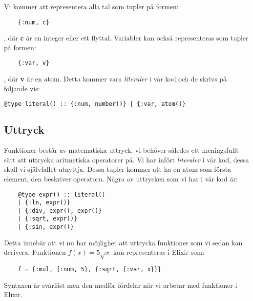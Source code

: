 \documentclass[a4paper,11pt]{article}
\begin{document}
Vi kommer att representera alla tal som tupler på formen: 
\begin{verbatim}
    {:num, c}
\end{verbatim}
, där \textbf{c} är en integer eller ett flyttal. Variabler kan också representeras som tupler på formen:
\begin{verbatim}
    {:var, v}
\end{verbatim}
, där \textbf{v} är en atom. Detta kommer vara \textit{literaler} i vår kod och de skrivs på följande vis:
\begin{verbatim}
@type literal() :: {:num, number()} | {:var, atom()}
\end{verbatim}
\subsection*{Uttryck}
Funktioner består av matematiska uttryck, vi behöver således ett meningsfullt sätt att uttrycka aritmetiska operatorer på. Vi har infört \textit{literaler} i vår kod, dessa skall vi självfallet utnyttja. Dessa tupler kommer att ha en atom som första element, den beskriver operatorn. Några av uttrycken som vi har i vår kod är: 
\begin{verbatim}
    @type expr() :: literal()
    | {:ln, expr()}
    | {:div, expr(), expr()}
    | {:sqrt, expr()}
    | {:sin, expr()}
\end{verbatim}
Detta innebär att vi nu har möjlighet att uttrycka funktioner som vi sedan kan derivera. Funktionen \( f(x) = 5\sqrt{x}\) kan representeras i Elixir som: 
\begin{verbatim}
    f = {:mul, {:num, 5}, {:sqrt, {:var, x}}}
\end{verbatim}
Syntaxen är svårläst men den medför fördelar när vi arbetar med funktioner i Elixir.
\end{document}
